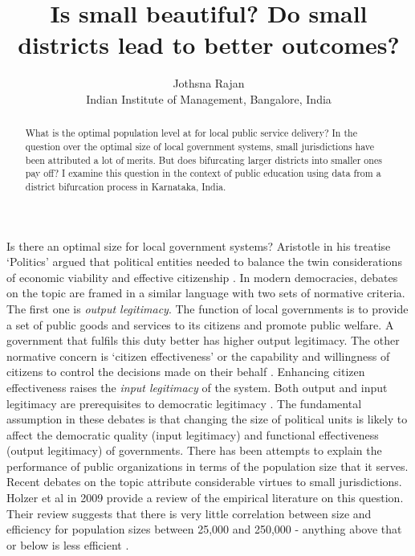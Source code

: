 \documentclass[12pt, a4paper]{article}
\title{Is small beautiful? Do small districts lead to better outcomes?}
\author{Jothsna Rajan \\
	\small{Indian Institute of Management, Bangalore, India}}
\begin{document}

	\maketitle
	\begin{abstract}
		What is the optimal population level at for local public service delivery? In the question over the optimal size of local government systems, small jurisdictions have been attributed a lot of merits. But does bifurcating larger districts into smaller ones pay off? I examine this question in the context of public education using data from a district bifurcation process in Karnataka, India.
	\end{abstract}
\paragraph{} Is there an optimal size for local government systems? Aristotle in his treatise `Politics' argued that political entities needed to balance the twin considerations of economic viability and effective citizenship \parencite{aristotle_politics_1984}. In modern democracies, debates on the topic are framed in a similar language with two sets of normative criteria. The first one is \textit{output legitimacy}. The function of local governments is to provide a set of public goods and services to its citizens and promote public welfare. A government that fulfils this duty better has higher output legitimacy. The other normative concern is `citizen effectiveness' or the capability and willingness of citizens to control the decisions made on their behalf \parencite{dahl_size_1973}. Enhancing citizen effectiveness raises the \textit{input legitimacy} of the system. Both output and input legitimacy are prerequisites to democratic legitimacy \parencite{scharpf_governing_1999}. The fundamental assumption in these debates is that changing the size of political units is likely to affect the democratic quality (input legitimacy) and functional effectiveness (output legitimacy) of governments. There has been attempts to explain the performance of public organizations in terms of the population size that it serves. Recent debates on the topic attribute considerable virtues to small jurisdictions. Holzer et al in 2009 provide a review of the empirical literature on this question. Their review suggests that there is very little correlation between size and efficiency for population sizes between 25,000 and 250,000 - anything above that or below is less efficient \parencite{holzer2009literature}. 
\end{document}
